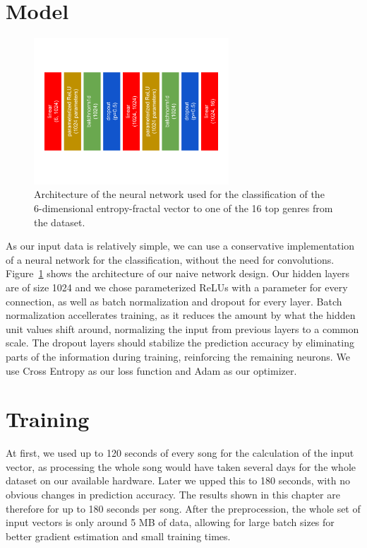 \section{Model}

\begin{figure}[!htb]
	\centering
	\includegraphics[width=0.65\textwidth]{images/entropymodel.png}
	\caption{Architecture of the neural network used for the classification
	of the 6-dimensional entropy-fractal vector to one of the 16 top
	genres from the dataset.}
	\label{entropymodel}
\end{figure}
As our input data is relatively simple, we can use a conservative
implementation of a neural network for the classification, without the
need for convolutions. Figure~\ref{entropymodel} shows the architecture
of our naive network design. Our hidden layers are of size 1024 and we
chose parameterized ReLUs with a parameter for every connection, as well
as batch normalization and dropout for every layer. Batch normalization
accellerates training, as it reduces the amount by what the hidden unit
values shift around, normalizing the input from previous layers to a
common scale. The dropout layers should stabilize the prediction
accuracy by eliminating parts of the information during training,
reinforcing the remaining neurons. We use Cross Entropy as our loss
function and Adam as our optimizer.

\section{Training}

At first, we used up to 120 seconds of every song for the calculation of
the input vector, as processing the whole song would have taken several
days for the whole dataset on our available hardware. Later we upped
this to 180 seconds, with no obvious changes in prediction accuracy. The
results shown in this chapter are therefore for up to 180 seconds per
song. After the preprocession, the whole set of input vectors is only
around 5 MB of data, allowing for large batch sizes for better gradient
estimation and small training times.

